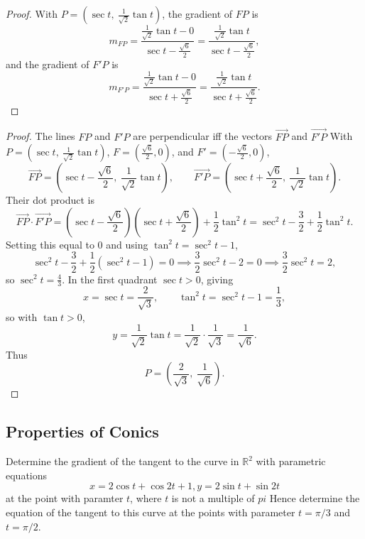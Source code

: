 \begin{proof}
    With $P = \left(\sec t,\ \tfrac{1}{\sqrt 2}\tan t\right)$, the gradient of $FP$ is
    \[m_{FP} = \frac{\tfrac{1}{\sqrt{2}}\tan t - 0}{\sec t - \tfrac{\sqrt{6}}{2}}
    = \frac{\tfrac{1}{\sqrt{2}}\tan t}{\sec t - \tfrac{\sqrt{6}}{2}},\]
    and the gradient of $F'P$ is
    \[m_{F'P} = \frac{\tfrac{1}{\sqrt{2}}\tan t - 0}{\sec t + \tfrac{\sqrt{6}}{2}}
    = \frac{\tfrac{1}{\sqrt{2}}\tan t}{\sec t + \tfrac{\sqrt{6}}{2}}.\]
\end{proof}

\newpage
\begin{proof}
    The lines $FP$ and $F'P$ are perpendicular iff the vectors $\vec{FP}$ and $\vec{F'P}$
    With
    $P = \left(\sec t,\ \tfrac{1}{\sqrt{2}}\tan t\right)$,
    $F = \left(\tfrac{\sqrt{6}}{2}, 0\right)$, and $F' = \left(-\tfrac{\sqrt{6}}{2}, 0\right)$,
    \[\vec{FP} = \left(\sec t - \frac{\sqrt{6}}{2},\ \frac{1}{\sqrt{2}}\tan t\right),
    \qquad
    \vec{F'P} = \left(\sec t + \frac{\sqrt{6}}{2},\ \frac{1}{\sqrt{2}}\tan t\right).\]
    Their dot product is
    \[\vec{FP} \cdot \vec{F'P}
    = \left(\sec t - \frac{\sqrt{6}}{2}\right)\left(\sec t + \frac{\sqrt{6}}{2}\right)
    + \frac{1}{2}\tan^2 t
    = \sec^2 t - \frac{3}{2} + \frac{1}{2}\tan^2 t.\]
    Setting this equal to $0$ and using $\tan^2 t = \sec^2 t - 1$,
    \[\sec^2 t - \frac{3}{2} + \frac{1}{2}\left(\sec^2 t - 1\right) = 0
    \implies \frac{3}{2}\sec^2 t - 2 = 0
    \implies \frac{3}{2}\sec^2 t = 2,\]
    so $\sec^2 t = \tfrac{4}{3}$. In the first quadrant $\sec t > 0$, giving
    \[x = \sec t = \frac{2}{\sqrt{3}}, \qquad \tan^2 t = \sec^2 t - 1 = \frac{1}{3},\]
    so with $\tan t > 0$,
    \[y = \frac{1}{\sqrt{2}}\tan t = \frac{1}{\sqrt{2}}\cdot\frac{1}{\sqrt{3}} = \frac{1}{\sqrt{6}}.\]
    Thus
    \[P = \left(\frac{2}{\sqrt{3}},\ \frac{1}{\sqrt{6}}\right).\]
\end{proof}

\subsection{Properties of Conics}

\begin{tcolorbox}[title=Problem 1, breakable]
    Determine the gradient of the tangent to the curve in $\mathbb{R}^2$
    with parametric equations 
    \[x = 2 \cos t + \cos 2t + 1, y = 2 \sin t + \sin 2t\]
    at the point with paramter $t$, where $t$ is not a multiple of $pi$
    Hence determine the equation of the tangent to this curve at the points 
    with parameter $t = \pi/3$ and $t = \pi/2$.
\end{tcolorbox}

